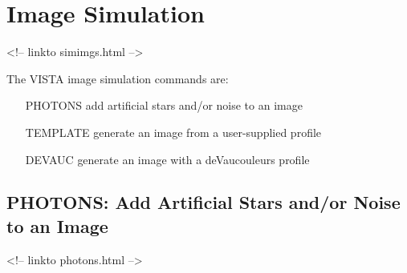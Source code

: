 \chapter{Image Simulation}
\begin{rawhtml}
<!-- linkto simimgs.html -->
\end{rawhtml}

%

The VISTA image simulation commands are:
\begin{itemize}
  \item[PHOTONS\hfill]{add artificial stars and/or noise to an image}
  \item[TEMPLATE\hfill]{generate an image from a user-supplied profile}
  \item[DEVAUC\hfill]{generate an image with a deVaucouleurs profile}
\end{itemize}

\section{PHOTONS: Add Artificial Stars and/or Noise to an Image}
\begin{rawhtml}
<!-- linkto photons.html -->
\end{rawhtml}

